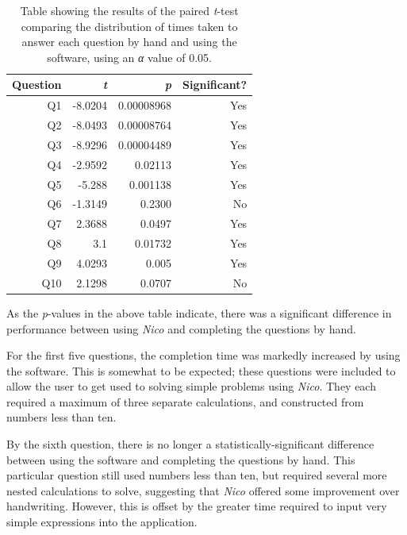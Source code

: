 \documentclass[12pt,twoside,notitlepage,xetex]{report}
\begin{document}
\begin{center}
\begin{table}[H]
\begin{center}
\begin{tabular}{|r|r|r|r|}
\hline
Question & \emph{t} & \emph{p} & Significant?\\ \hline \hline
Q1 & -8.0204 & 0.00008968 & Yes\\ \hline
Q2 & -8.0493 & 0.00008764 & Yes\\ \hline
Q3 & -8.9296 & 0.00004489 & Yes\\ \hline
Q4 & -2.9592 & 0.02113 & Yes\\ \hline
Q5 & -5.288 & 0.001138 & Yes\\ \hline
Q6 & -1.3149 & 0.2300 & No\\ \hline
Q7 & 2.3688 & 0.0497 & Yes\\ \hline
Q8 & 3.1 & 0.01732 & Yes\\ \hline
Q9 & 4.0293 & 0.005 & Yes\\ \hline
Q10 & 2.1298 & 0.0707 & No\\
\hline
\end{tabular}
\end{center}
\caption{Table showing the results of the paired \emph{t}-test comparing the distribution of times taken to answer each question by hand and using the software, using an \emph{α} value of 0.05.}
\label{tab:TTests}
\end{table}
\end{center}

As the \emph{p}-values in the above table indicate, there was a significant difference in performance between using \emph{Nico} and completing the questions by hand.

For the first five questions, the completion time was markedly increased by using the software.  This is somewhat to be expected;  these questions were included to allow the user to get used to solving simple problems using \emph{Nico}.  They each required a maximum of three separate calculations, and constructed from numbers less than ten.

By the sixth question, there is no longer a statistically-significant difference between using the software and completing the questions by hand.  This particular question still used numbers less than ten, but required several more nested calculations to solve, suggesting that \emph{Nico} offered some improvement over handwriting.  However, this is offset by the greater time required to input very simple expressions into the application.
\end{document}
